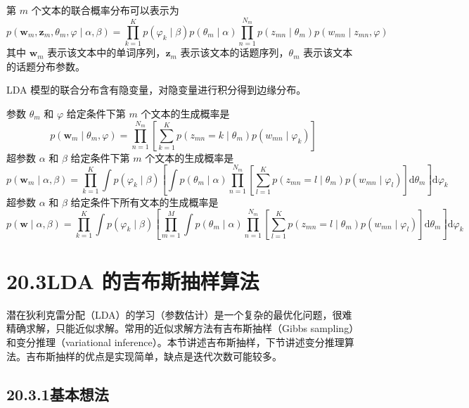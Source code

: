 \documentclass[UTF8, 12pt, fontset=fandol, oneside]{ctexart}
\begin{document}
第 $m$ 个文本的联合概率分布可以表示为
\begin{equation}
p(\mathbf{w}_m,\mathbf{z}_m,\theta_m,\varphi\mid\alpha,\beta)=\prod_{k=1}^K p(\varphi_k\mid\beta)p(\theta_m\mid\alpha)\prod_{n=1}^{N_m}p(z_{mn}\mid\theta_m)p(w_{mn}\mid z_{mn},\varphi)
\tag{20.16}
\end{equation}
其中 $\mathbf{w}_m$ 表示该文本中的单词序列，$\mathbf{z}_m$ 表示该文本的话题序列，$\theta_m$ 表示该文本的话题分布参数。

LDA 模型的联合分布含有隐变量，对隐变量进行积分得到边缘分布。

参数 $\theta_m$ 和 $\varphi$ 给定条件下第 $m$ 个文本的生成概率是
\begin{equation}
p(\mathbf{w}_m\mid\theta_m,\varphi)=\prod_{n=1}^{N_m}\left[\sum_{k=1}^K p(z_{mn}=k\mid\theta_m)p(w_{mn}\mid\varphi_k)\right]
\tag{20.17}
\end{equation}
超参数 $\alpha$ 和 $\beta$ 给定条件下第 $m$ 个文本的生成概率是
\begin{equation}
p(\mathbf{w}_m\mid\alpha,\beta)=\prod_{k=1}^K \int p(\varphi_k\mid\beta)\left[\int p(\theta_m\mid\alpha)\prod_{n=1}^{N_m}\left[\sum_{l=1}^K p(z_{mn}=l\mid\theta_m)p(w_{mn}\mid\varphi_l)\right]\mathrm{d}\theta_m\right]\mathrm{d}\varphi_k
\tag{20.18}
\end{equation}
超参数 $\alpha$ 和 $\beta$ 给定条件下所有文本的生成概率是
\begin{equation}
p(\mathbf{w}\mid\alpha,\beta)=\prod_{k=1}^K \int p(\varphi_k\mid\beta)\left[\prod_{m=1}^M \int p(\theta_m\mid\alpha)\prod_{n=1}^{N_m}\left[\sum_{l=1}^K p(z_{mn}=l\mid\theta_m)p(w_{mn}\mid\varphi_l)\right]\mathrm{d}\theta_m\right]\mathrm{d}\varphi_k
\tag{20.19}
\end{equation}

\section*{20.3\quad LDA 的吉布斯抽样算法}

潜在狄利克雷分配（LDA）的学习（参数估计）是一个复杂的最优化问题，很难精确求解，只能近似求解。常用的近似求解方法有吉布斯抽样（Gibbs sampling）和变分推理（variational inference）。本节讲述吉布斯抽样，下节讲述变分推理算法。吉布斯抽样的优点是实现简单，缺点是迭代次数可能较多。

\subsection*{20.3.1\quad 基本想法}
\end{document}
